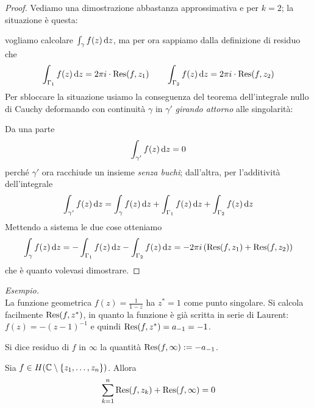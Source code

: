 \begin{proof} 
Vediamo una dimostrazione abbastanza approssimativa e per $k=2$; la situazione è questa:


vogliamo calcolare $\int_{\gamma}f(z)\, \mathrm{d} z$, ma per ora sappiamo dalla definizione di residuo che
$$\int_{\Gamma_1}f(z)\, \mathrm{d} z=2\pi i\cdot \operatorname{Res}(f,z_1) \qquad \int_{\Gamma_2}f(z)\, \mathrm{d} z=2\pi i\cdot \operatorname{Res}(f,z_2)$$
Per sbloccare la situazione usiamo la conseguenza del teorema dell'integrale nullo di Cauchy deformando con continuità $\gamma$ in $\gamma'$ \textit{girando attorno} alle singolarità:


Da una parte 
$$\int_{\gamma'}f(z)\, \mathrm{d} z=0$$
perché $\gamma'$ ora racchiude un insieme \textit{senza buchi}; dall'altra, per l'additività dell'integrale 
$$
\int_{\gamma'}f(z)\, \mathrm{d} z=\int_\gamma f(z)\, \mathrm{d} z+\int_{\Gamma_1}f(z)\, \mathrm{d} z+\int_{\Gamma_2}f(z)\, \mathrm{d} z
$$
Mettendo a sistema le due cose otteniamo
\begin{equation*}
\int_\gamma f(z)\, \mathrm{d} z=-\int_{\Gamma_1}f(z)\, \mathrm{d} z-\int_{\Gamma_2}f(z)\, \mathrm{d} z=-2\pi i\left(\operatorname{Res}(f,z_1)+\operatorname{Res}(f,z_2)\right)
\end{equation*}
che è quanto volevasi dimostrare.
\end{proof}

\textit{Esempio.}\\
La funzione geometrica $f(z)=\frac{1}{1-z}$ ha $z^*=1$ come punto singolare. Si calcola facilmente $\operatorname{Res}(f,z^*)$, in quanto la funzione è già scritta in serie di Laurent: $f(z)=-(z-1)^{-1}$ e quindi $\operatorname{Res}(f,z^*)=a_{-1}=-1$.

\begin{defn}
Si dice residuo di $f$ in $\infty$ la quantità $\operatorname{Res}(f,\infty):=-a_{-1}$.
\end{defn}

\begin{thm}
Sia $f\in H(\mathbb{C}\setminus\{z_1,\dotsc,z_n\})$. Allora
\begin{equation*}
\sum\limits^{n}_{k = 1}\operatorname{Res} (f, z_{k}) + \operatorname{Res} (f, \infty) = 0
\end{equation*}
\end{thm}

